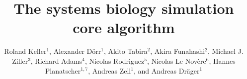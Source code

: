 \documentclass[10pt]{bmc_article}
\newenvironment{bmcformat}{\fussy\setboolean{publ}{true}}{\fussy}
\begin{document}
\begin{bmcformat}



\title{The systems biology simulation core algorithm}



\author{%
Roland Keller$^{1}$, %
Alexander D\"orr$^{1}$, %
Akito Tabira$^{2}$, %
Akira Funahashi$^{2}$, %
Michael J. Ziller$^{3}$, %
Richard Adams$^{4}$, %
Nicolas Rodriguez$^{5}$, %
Nicolas Le Nov\`{e}re$^{6}$, %
Hannes Planatscher$^{1,7}$, %
Andreas Zell$^{1}$, %
and Andreas Dr\"ager$^{1}$\correspondingauthor{}%
}


\address{%
\iid(1)Center for Bioinformatics Tuebingen (ZBIT), University of
Tuebingen, T\"ubingen, Germany
\iid(2)Keio University, Graduate School of
Science and Technology, Yokohama, Japan 
\iid(3)Department of Stem Cell and Regenerative Biology, Harvard University,
Cambridge, MA, USA
\iid(4)SynthSys Edinburgh, CH Waddington Building, University of Edinburgh,
Edinburgh EH9 3JD, UK
\iid(5)European Bioinformatics Institute, Wellcome Trust Genome Campus, Hinxton,
Cambridge, UK
\iid(6)Babraham Institute, Babraham, Cambridge, UK
\iid(7)Present address: Natural and Medical Sciences Institute at the University of Tuebingen,
Reutlingen, Germany}


\end{bmcformat}
\end{document}
